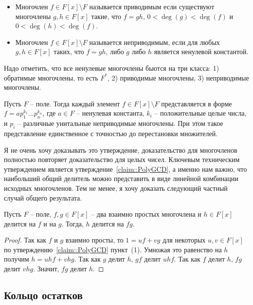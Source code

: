 \begin{definition}
\begin{itemize}
\item Многочлен $ f\in F[x]\setminus F$ называется приводимым если существуют многочлены $g,h\in F[x]$ такие, что $f = gh$, $0<\deg (g) < \deg (f)$ и $0 < \deg(h) < \deg(f)$.

\item Многочлен $f\in F[x]\setminus F$ называется неприводимым, если для любых $g,h\in F[x]$ таких, что $f = gh$, либо $g$ либо $h$ является ненулевой константой.
\end{itemize}
\end{definition}

Надо отметить, что все ненулевые многочлены бьются на три класса: 1) обратимые многочлены, то есть $F^*$, 2) приводимые многочлены, 3) неприводимые многочлены.

\begin{claim}
[UFD]
\label{claim::PolyUFD}
Пусть $F$ -- поле.
Тогда каждый элемент $f\in F[x]\setminus F$ представляется в форме $f = a p_1^{k_1}\ldots p_n^{k_n}$, где $a\in F$ -- ненулевая константа, $k_i$ -- положительные целые числа, и $p_i$ -- различные унитальные неприводимые многочлены.
При этом такое представление единственное с точностью до перестановки множителей.
\end{claim}

Я не очень хочу доказывать это утверждение, доказательство для многочленов полностью повторяет доказательство для целых чисел.
Ключевым техническим утверждением является утверждение~\ref{claim::PolyGCD}, а именно нам важно, что наибольший общий делитель можно представить в виде линейной комбинации исходных многочленов.
Тем не менее, я хочу доказать следующий частный случай общего результата.

\begin{claim}
Пусть $F$ -- поле, $f, g\in F[x]$ -- два взаимно простых многочлена и $h\in F[x]$ делится на $f$ и на $g$.
Тогда, $h$ делится на $fg$.
\end{claim}
\begin{proof}
Так как $f$ и $g$ взаимно просты, то $1 = uf + vg$ для некоторых $u,v\in F[x]$ по утверждению~\ref{claim::PolyGCD} пункт~(1).
Умножая это равенство на $h$ получим $h = u hf + v hg$.
Так как $g$ делит $h$, $gf$ делит $uhf$.
Так как $f$ делит $h$, $fg$ делит $vhg$.
Значит, $fg$ делит $h$.
\end{proof}

\subsection{Кольцо остатков}

